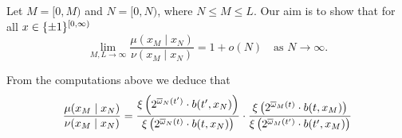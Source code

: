 \documentclass[11pt, a4paper, oneside]{article}
\theoremstyle{definition}
\theoremstyle{remark}
\providecommand{\ol}{\overline}
\providecommand{\ordo}[1]{{o(#1)}}
\begin{document}
Let $M=[0,M)$ and $N=[0,N)$, where $N\le M \le L$.
Our aim is to show that for all $x\in\{\pm1\}^{[0,\infty)}$
\[
  \lim_{M,L\to\infty} \frac{\mu(x_M\mid x_N)}{\nu(x_M \mid x_N)} = 1+\ordo N \quad\text{as $N\to\infty$.}
\]

From the computations above we deduce that 
\[
  \frac{\mu(x_M\mid x_N)}{\nu(x_M \mid x_N)} =
  \frac{\XI{2^{\ol\omega_N(t')} \cdot b(t',x_N)}}
  {\XI{2^{\ol\omega_N(t)} \cdot b(t,x_N)}} \cdot
  \frac{\XI{2^{\ol\omega_M(t)} \cdot b(t,x_M)}}
  {\XI{2^{\ol\omega_M(t')} \cdot b(t',x_M)}} 
\]
\end{document}
